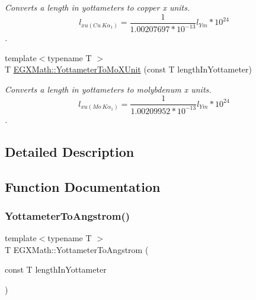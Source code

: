 \begin{DoxyCompactItemize}
\begin{DoxyCompactList}\small\item\em Converts a length in yottameters to copper x units. \[ l_{xu(Cu\ K\alpha_1)}= \frac{1}{1.00207697*10^{-13}} l_{Ym} * 10^{24}\]. \end{DoxyCompactList}\item 
{\footnotesize template$<$typename T $>$ }\\T \mbox{\hyperlink{group___e_g_x_math-_conversions-_length_conversions-_s_i-_yottameter-_non-_s_i_ga545da9526f7a62f5ca7d1800faf17d1d}{E\+G\+X\+Math\+::\+Yottameter\+To\+Mo\+X\+Unit}} (const T length\+In\+Yottameter)
\begin{DoxyCompactList}\small\item\em Converts a length in yottameters to molybdenum x units. \[ l_{xu(Mo\ K\alpha_1)}=\frac{1}{1.00209952*10^{-13}} l_{Ym} * 10^{24}\]. \end{DoxyCompactList}\end{DoxyCompactItemize}


\subsection{Detailed Description}


\subsection{Function Documentation}
\mbox{\label{group___e_g_x_math-_conversions-_length_conversions-_s_i-_yottameter-_non-_s_i_ga0129b788ceb2d7d4ce86c155ee9d4675}} 
\subsubsection{\texorpdfstring{Yottameter\+To\+Angstrom()}{YottameterToAngstrom()}}
{\footnotesize\ttfamily template$<$typename T $>$ \\
T E\+G\+X\+Math\+::\+Yottameter\+To\+Angstrom (\begin{DoxyParamCaption}\item[{const T}]{length\+In\+Yottameter }\end{DoxyParamCaption})}



